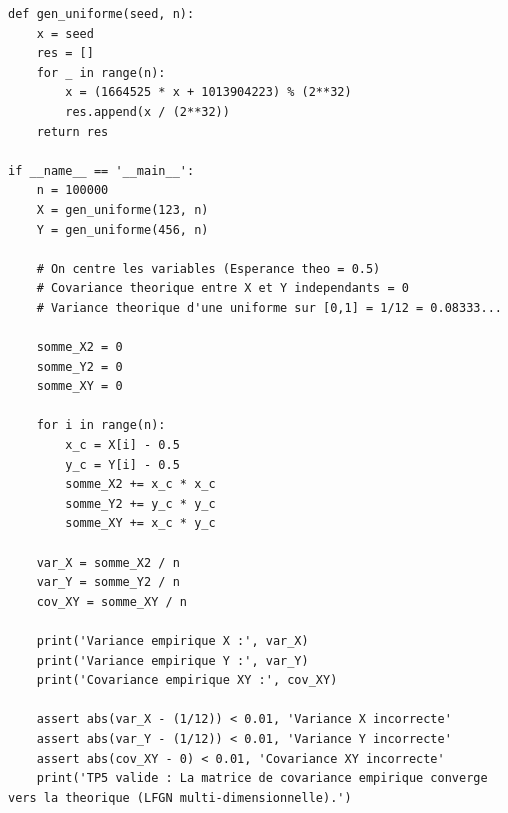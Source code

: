 \documentclass[11pt,a4paper]{article}
\begin{document}
\begin{lstlisting}
def gen_uniforme(seed, n):
    x = seed
    res = []
    for _ in range(n):
        x = (1664525 * x + 1013904223) % (2**32)
        res.append(x / (2**32))
    return res

if __name__ == '__main__':
    n = 100000
    X = gen_uniforme(123, n)
    Y = gen_uniforme(456, n)

    # On centre les variables (Esperance theo = 0.5)
    # Covariance theorique entre X et Y independants = 0
    # Variance theorique d'une uniforme sur [0,1] = 1/12 = 0.08333...

    somme_X2 = 0
    somme_Y2 = 0
    somme_XY = 0

    for i in range(n):
        x_c = X[i] - 0.5
        y_c = Y[i] - 0.5
        somme_X2 += x_c * x_c
        somme_Y2 += y_c * y_c
        somme_XY += x_c * y_c

    var_X = somme_X2 / n
    var_Y = somme_Y2 / n
    cov_XY = somme_XY / n

    print('Variance empirique X :', var_X)
    print('Variance empirique Y :', var_Y)
    print('Covariance empirique XY :', cov_XY)

    assert abs(var_X - (1/12)) < 0.01, 'Variance X incorrecte'
    assert abs(var_Y - (1/12)) < 0.01, 'Variance Y incorrecte'
    assert abs(cov_XY - 0) < 0.01, 'Covariance XY incorrecte'
    print('TP5 valide : La matrice de covariance empirique converge vers la theorique (LFGN multi-dimensionnelle).')
\end{lstlisting}
\end{document}
